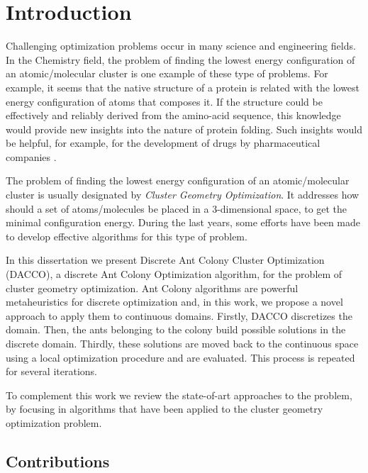 \chapter{Introduction}
Challenging optimization problems occur in many science and engineering fields. In the Chemistry field, the problem of finding the lowest energy configuration of an atomic/molecular cluster is one example of these type of problems. For example, it seems that the native structure of a protein is related with the lowest energy configuration of atoms that composes it. If the structure could be effectively and reliably derived from the amino-acid sequence, this knowledge would provide new insights into the nature of protein folding. Such insights would be helpful, for example, for the development of drugs by pharmaceutical companies \cite{wales97}.

The problem of finding the lowest energy configuration of an atomic/molecular cluster is usually designated by \emph{Cluster Geometry Optimization}. It addresses how should a set of atoms/molecules be placed in a 3-dimensional space, to get the minimal configuration energy. During the last years, some efforts have been made to develop effective algorithms for this type of problem.

In this dissertation we present Discrete Ant Colony Cluster Optimization (DACCO), a discrete Ant Colony Optimization algorithm, for the problem of cluster geometry optimization. Ant Colony algorithms are powerful metaheuristics for discrete optimization and, in this work, we propose a novel approach to apply them to continuous domains. Firstly, DACCO discretizes the domain. Then, the ants belonging to the colony build possible solutions in the discrete domain. Thirdly, these solutions are moved back to the continuous space using a local optimization procedure and are evaluated. This process is repeated for several iterations.

To complement this work we review the state-of-art approaches to the problem, by focusing in algorithms that have been applied to the cluster geometry optimization problem.


\section{Contributions}


